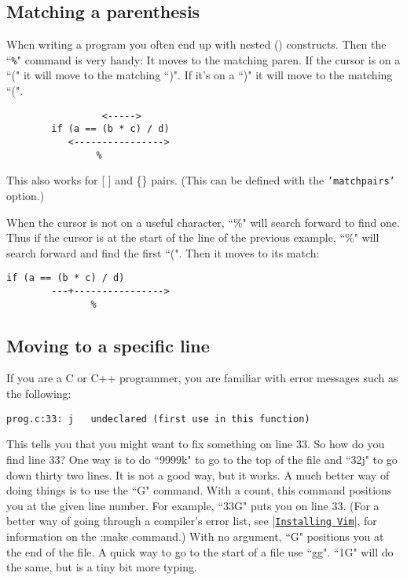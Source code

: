 \subsection{Matching a parenthesis}

When writing a program you often end up with nested () constructs.
Then the ``\texttt{\%}" command is very handy: It moves to the matching paren.
If the cursor is on a ``(" it will move to the matching ``)".
If it's on a ``)" it will move to the matching ``(".

\begin{Verbatim}[samepage=true]
                   %
                 <----->
        if (a == (b * c) / d)
           <---------------->
                %
\end{Verbatim}

This also works for [ ] and \{\} pairs.
(This can be defined with the \texttt{'matchpairs'} option.)

When the cursor is not on a useful character, ``\%" will search forward to find one.
Thus if the cursor is at the start of the line of the previous example, ``\%" will search forward and find the first ``(".
Then it moves to its match:

\begin{Verbatim}[samepage=true]
        if (a == (b * c) / d)
        ---+---------------->
               %
\end{Verbatim}


\subsection{Moving to a specific line}

If you are a C or C++ programmer, you are familiar with error messages such as the following:

		\begin{Verbatim}[samepage=true]
    prog.c:33: j   undeclared (first use in this function)
		\end{Verbatim}

This tells you that you might want to fix something on line 33.
So how do you find line 33?  One way is to do ``9999k" to go to the top of the file and ``32j" to go down thirty two lines.
It is not a good way, but it works.
A much better way of doing things is to use the ``G" command.
With a count, this command positions you at the given line number.
For example, ``33G" puts you on line 33.
(For a better way of going through a compiler's error list, see |\hyperref[Installing Vim]{\texttt{Installing Vim}}|, for information on the :make command.) With no argument, ``G" positions you at the end of the file.
A quick way to go to the start of a file use ``gg".
``1G" will do the same, but is a tiny bit more typing.


